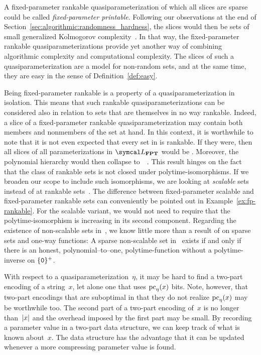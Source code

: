 A fixed-parameter \pdash{}rankable quasiparameterization of which all slices are sparse could be called \emph{fixed-parameter \pdash{}printable}.
Following our observations at the end of Section~\ref{sec:algorithmic:randomness_hardness}, the slices would then be sets of small generalized Kolmogorov complexity~\parencite{allender1988p-printable}.
In that way, the fixed-parameter \pdash{}rankable quasiparameterizations provide yet another way of combining algorithmic complexity and computational complexity.
The slices of such a quasiparameterization are a model for non-random sets, and at the same time, they are easy in the sense of Definition~\ref{def:easy}.

Being fixed-parameter \pdash{}rankable is a property of a quasiparameterization in isolation.
This means that such rankable quasiparameterizations can be considered also in relation to sets that are themselves in no way \pdash{}rankable.
Indeed, a slice of a fixed-parameter \pdash{}rankable quasiparameterization may contain both members and nonmembers of the set at hand.
In this context, it is worthwhile to note that it is not even expected that every set in  is \pdash{}rankable.
If they were, then all slices of all parameterizations in $\calL_\cl{FPT}$ would be .
Moreover, the polynomial hierarchy would then collapse to~~\parencite{hemachandra1990complexity}.
This result hinges on the fact that the class of rankable sets is not closed under polytime-isomorphisms.
If we broaden our scope to include such isomorphisms, we are looking at \emph{scalable} sets instead of at rankable sets~\parencite{goldsmith1996scalability}.
The difference between fixed-parameter scalable and fixed-parameter \pdash{}rankable sets can conveniently be pointed out in Example~\ref{ex:fp-rankable}.
For the scalable variant, we would not need to require that the polytime-isomorphism is increasing in its second component.
Regarding the existence of non-scalable sets in~, we know little more than a result of \textcite{allender1986complexity} on sparse sets and one-way functions:
A sparse non-scalable set in~ exists if and only if there is an honest, polynomial--to--one, polytime-function without a polytime-inverse on $\{\textnormal{\texttt{0}}\}^+$.

With respect to a quasiparameterization~$\eta$, it may be hard to find a two-part encoding of a string~$x$, let alone one that uses $\operatorname{pc}_\eta(x)$ bits.
Note, however, that two-part encodings that are suboptimal in that they do not realize $\operatorname{pc}_\eta(x)$ may be worthwhile too.
The second part of a two-part encoding of~$x$ is no longer than~${\lvert x\rvert}$ and the overhead imposed by the first part may be small.
By recording a parameter value in a two-part data structure, we can keep track of what is known about~$x$.
The data structure has the advantage that it can be updated whenever a more compressing parameter value is found.

